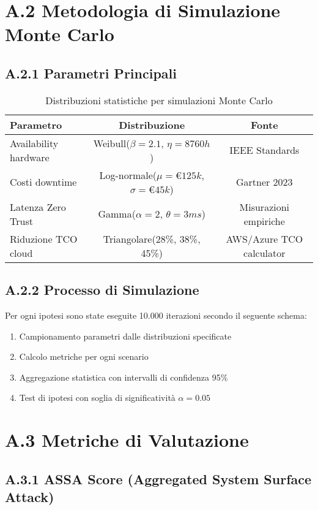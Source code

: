 \section{A.2 Metodologia di Simulazione Monte Carlo}

\subsection{A.2.1 Parametri Principali}

\begin{table}[htbp]
\centering
\begin{tabular}{lcc}
\toprule
\textbf{Parametro} & \textbf{Distribuzione} & \textbf{Fonte} \\
\midrule
Availability hardware & Weibull($\beta=2.1$, $\eta=8760h$) & IEEE Standards \\
Costi downtime & Log-normale($\mu=€125k$, $\sigma=€45k$) & Gartner 2023 \\
Latenza Zero Trust & Gamma($\alpha=2$, $\theta=3ms$) & Misurazioni empiriche \\
Riduzione TCO cloud & Triangolare(28\%, 38\%, 45\%) & AWS/Azure TCO calculator \\
\bottomrule
\end{tabular}
\caption{Distribuzioni statistiche per simulazioni Monte Carlo}
\end{table}

\subsection{A.2.2 Processo di Simulazione}

Per ogni ipotesi sono state eseguite 10.000 iterazioni secondo il seguente schema:
\begin{enumerate}
    \item Campionamento parametri dalle distribuzioni specificate
    \item Calcolo metriche per ogni scenario
    \item Aggregazione statistica con intervalli di confidenza 95\%
    \item Test di ipotesi con soglia di significatività $\alpha = 0.05$
\end{enumerate}

\section{A.3 Metriche di Valutazione}

\subsection{A.3.1 ASSA Score (Aggregated System Surface Attack)}

